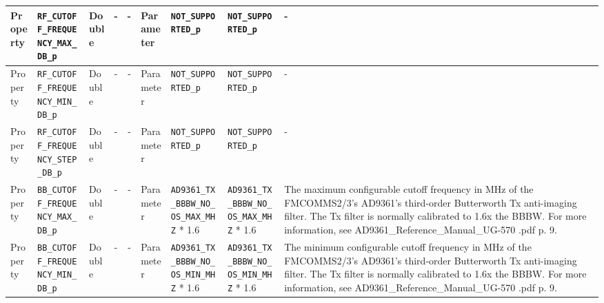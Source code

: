 \documentclass{article}
\begin{document}
\begin{landscape}
\begin{scriptsize}
\begin{longtable}{|p{1.8cm}|p{4.1cm}|p{1cm}|c|c|p{1.6cm}|p{3.7cm}|p{3.7cm}|p{2.5cm}|}
			\hline
			Property     & \verb+RF_CUTOFF_FREQUENCY_MAX_DB_p+ & Double & -       & -          & Parameter & \verb+NOT_SUPPORTED_p+ & \verb+NOT_SUPPORTED_p+ & - \\
			\hline
			Property     & \verb+RF_CUTOFF_FREQUENCY_MIN_DB_p+ & Double & -       & -          & Parameter & \verb+NOT_SUPPORTED_p+ & \verb+NOT_SUPPORTED_p+ & - \\
			\hline
			Property     & \verb+RF_CUTOFF_FREQUENCY_STEP_DB_p+ & Double & -       & -          & Parameter & \verb+NOT_SUPPORTED_p+ & \verb+NOT_SUPPORTED_p+ & - \\
			\hline
			Property     & \verb+BB_CUTOFF_FREQUENCY_MAX_DB_p+ & Double & -       & -          & Parameter & \verb+AD9361_TX_BBBW_NO_OS_MAX_MHZ+ * 1.6 & \verb+AD9361_TX_BBBW_NO_OS_MAX_MHZ+ * 1.6 &
The maximum configurable cutoff frequency in MHz of the FMCOMMS2/3's AD9361's third-order Butterworth Tx anti-imaging filter. The Tx filter is normally calibrated to 1.6x the BBBW. For more information, see AD9361\_Reference\_Manual\_UG-570    .pdf p. 9.

			\\
			\hline
			Property     & \verb+BB_CUTOFF_FREQUENCY_MIN_DB_p+ & Double & -       & -          & Parameter & \verb+AD9361_TX_BBBW_NO_OS_MIN_MHZ+ * 1.6 & \verb+AD9361_TX_BBBW_NO_OS_MIN_MHZ+ * 1.6 &
The minimum configurable cutoff frequency in MHz of the FMCOMMS2/3's AD9361's third-order Butterworth Tx anti-imaging filter. The Tx filter is normally calibrated to 1.6x the BBBW. For more information, see AD9361\_Reference\_Manual\_UG-570    .pdf p. 9.


\end{longtable}
\end{scriptsize}
\end{landscape}
\end{document}
